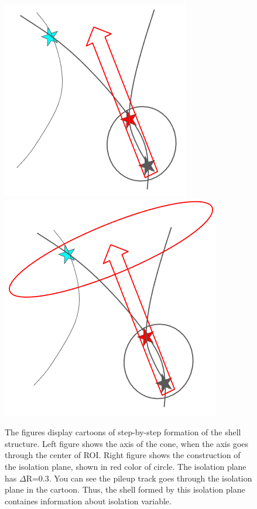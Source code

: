 \begin{figure}[h!]
  \centering
  \includegraphics[width=0.4\linewidth]{figs/MLP4.png}
  \includegraphics[width=0.4\linewidth]{figs/MLP5.png}
\caption{The figures display cartoons of step-by-step formation of the shell structure. 
	Left figure shows the axis of the cone, when the axis goes through the center of ROI.
	Right figure shows the construction of the isolation plane, shown in red color of circle.
	The isolation plane has $\Delta$R=0.3. 
	You can see the pileup track goes through the isolation plane in the cartoon.
	Thus, the shell formed by this isolation plane containes information about isolation variable.
	}
  \label{fig:Clustering}
\end{figure}

